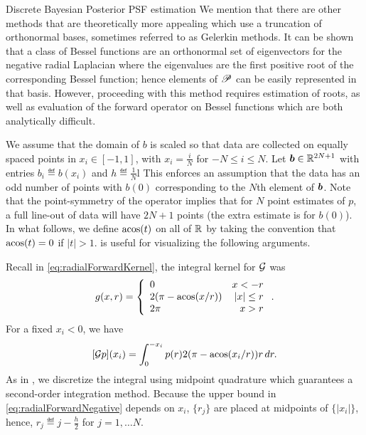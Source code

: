 \begin{chapter}{Discrete Bayesian Posterior PSF estimation}
We mention that there are other methods that are theoretically more appealing which use a truncation of orthonormal bases, sometimes referred to as Gelerkin methods.
It can be shown that a class of Bessel functions are an orthonormal set of eigenvectors for the negative radial Laplacian where the eigenvalues are the first positive root of the corresponding Bessel function; hence elements of $\mathscr P$ can be easily represented in that basis.
However, proceeding with this method requires estimation of roots, as well as evaluation of the forward operator on Bessel functions which are both analytically difficult.


We assume that the domain of $b$ is scaled so that data are collected on equally spaced points in $x_i \in [-1,1]$, with $x_i = \frac iN$ for $-N\le i\le N$.
Let $\mbox{\boldmath$b$} \in \mathbb R^{2N + 1}$ with entries $b_i \eqdef b(x_i)$ and $h\eqdef \frac 1N$l 
This enforces an assumption that the data has an odd number of points with $b(0)$ corresponding to the $N$th element of $\mbox{\boldmath$b$}$. 
Note that the point-symmetry of the operator implies that for $N$ point estimates of $p$, a full line-out of data will have $2N + 1$ points (the extra estimate is for $b(0)$).
In what follows, we define $\operatorname*{acos}(t)$ on all of $\mathbb R$ by taking the convention that $\operatorname*{acos}(t) = 0$ if $|t| > 1$.
 is useful for visualizing the following arguments.

Recall in \eqref{eq:radialForwardKernel}, the integral kernel for $\mathcal G$ was
\begin{equation} 
  g(x,r) = \left\{\begin{array}{lr}
    0 & x < - r\\
    2(\pi - \operatorname*{acos}(x/r)) & |x| \le r\\
    2\pi &  x> r
  \end{array}\right..  
\end{equation}
For a fixed  $x_i<0$, we have
\begin{equation} \label{eq:radialForwardNegative}
  [\mathcal G p](x_i) = \int_0^{-x_i} p(r)2(\pi - \operatorname*{acos}(x_i/r))r\,dr.
\end{equation}
As in \citep{bardsley2012mcmc}, we discretize the integral using midpoint quadrature which guarantees a second-order integration method.
Because the upper bound in \eqref{eq:radialForwardNegative} depends on $x_i$, $\{r_j\}$ are placed at midpoints of $\{|x_i|\}$, hence, $r_j \eqdef j-\frac h2$ for $j=1,\dots N$. 


\end{chapter}
